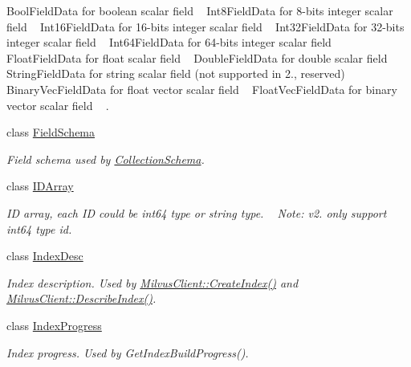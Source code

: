 \begin{DoxyCompactItemize}
\begin{DoxyCompactList}
 Bool\+Field\+Data for boolean scalar field ~\newline
 Int8\+Field\+Data for 8-\/bits integer scalar field ~\newline
 Int16\+Field\+Data for 16-\/bits integer scalar field ~\newline
 Int32\+Field\+Data for 32-\/bits integer scalar field ~\newline
 Int64\+Field\+Data for 64-\/bits integer scalar field ~\newline
 Float\+Field\+Data for float scalar field ~\newline
 Double\+Field\+Data for double scalar field ~\newline
 String\+Field\+Data for string scalar field (not supported in 2., reserved) ~\newline
 Binary\+Vec\+Field\+Data for float vector scalar field ~\newline
 Float\+Vec\+Field\+Data for binary vector scalar field ~\newline
. \end{DoxyCompactList}\item 
class \hyperlink{classmilvus_1_1_field_schema}{Field\+Schema}
\begin{DoxyCompactList}\small\item\em Field schema used by \hyperlink{classmilvus_1_1_collection_schema}{Collection\+Schema}. \end{DoxyCompactList}\item 
class \hyperlink{classmilvus_1_1_i_d_array}{I\+D\+Array}
\begin{DoxyCompactList}\small\item\em ID array, each ID could be int64 type or string type. ~\newline
Note\+: v2. only support int64 type id. \end{DoxyCompactList}\item 
class \hyperlink{classmilvus_1_1_index_desc}{Index\+Desc}
\begin{DoxyCompactList}\small\item\em Index description. Used by \hyperlink{classmilvus_1_1_milvus_client_a9d56f35a497504a7dee610d368d22b7a}{Milvus\+Client\+::\+Create\+Index()} and \hyperlink{classmilvus_1_1_milvus_client_a58ed7015339719ab8dc7d6acad90d9a1}{Milvus\+Client\+::\+Describe\+Index()}. \end{DoxyCompactList}\item 
class \hyperlink{classmilvus_1_1_index_progress}{Index\+Progress}
\begin{DoxyCompactList}\small\item\em Index progress. Used by Get\+Index\+Build\+Progress(). \end{DoxyCompactList}\item 

\end{DoxyCompactItemize}
